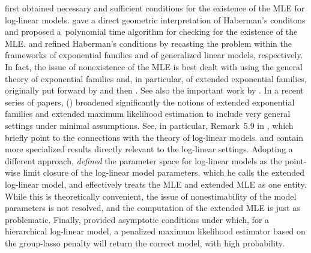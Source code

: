 \documentclass[aos,MSNbibl,nameyear,dvips]{arximspdf}
\begin{document}

\citet{HAB74} first obtained necessary and sufficient conditions for
the existence of the MLE for log-linear models. \citet{MLE06} gave a
direct geometric interpretation of Haberman's conditons and proposed a~polynomial time algorithm for checking for the existence of the MLE.
\citet{AIK79} and \citet{VER92} refined Haberman's conditions by
recasting the problem within the frameworks of exponential families and
of generalized linear models, respectively. In fact, the issue of
nonexistence of the MLE is best dealt with using the general theory of
exponential families and, in particular, of extended exponential
families, originally put forward by \citet{BARN78} and then
\citet{BRW86}. See also the important work by \citet{CENCOV82}.
In a recent series of papers, \citeauthor{CM01} (\citeyear{CM01,CM03,CM05,CM08}) broadened significantly the notions of extended
exponential families and extended maximum likelihood estimation to
include very general settings under minimal assumptions. See, in
particular, Remark~5.9 in \citet{CM08}, which briefly point to the
connections with the theory of log-linear models. \citet{ERGM09} and
\citet{GEYER09} contain more specialized results directly relevant to
the log-linear settings. Adopting a different approach, \citet{LAU96}
{\it defined} the parameter space for log-linear models as the
point-wise limit closure of the log-linear model parameters, which he
calls the extended log-linear model, and effectively treats the MLE and
extended MLE as one entity. While this is theoretically convenient, the
issue of nonestimability of the model parameters is not resolved, and
the computation of the extended MLE is just as problematic. Finally,
\citet{NR11} provided asymptotic conditions under which, for a
hierarchical log-linear model, a penalized maximum likelihood estimator
based on the group-lasso penalty will return the correct model, with
high probability.

\end{document}
